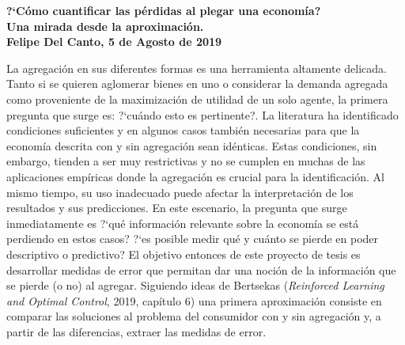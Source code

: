 \documentclass[english, a4paper,12pt]{article}
\begin{document}
\thispagestyle{empty}
%
%
%
\begin{center} \bf
	?`Cómo cuantificar las pérdidas al plegar una economía? \\ Una mirada desde la aproximación. \\ Felipe Del Canto, 5 de Agosto de 2019
\end{center}

La agregación en sus diferentes formas es una herramienta altamente delicada. Tanto si se quieren aglomerar bienes en uno o considerar la demanda agregada como proveniente de la maximización de utilidad de un solo agente, la primera pregunta que surge es: ?`cuándo esto es pertinente?. La literatura ha identificado condiciones suficientes y en algunos casos también necesarias para que la economía descrita con y sin agregación sean idénticas. Estas condiciones, sin embargo, tienden a ser muy restrictivas y no se cumplen en muchas de las aplicaciones empíricas donde la agregación es crucial para la identificación. Al mismo tiempo, su uso inadecuado puede afectar la interpretación de los resultados y sus predicciones. En este escenario, la pregunta que surge inmediatamente es ?`qué información relevante sobre la economía se está perdiendo en estos casos? ?`es posible medir qué y cuánto se pierde en poder descriptivo o predictivo? El objetivo entonces de este proyecto de tesis es desarrollar medidas de error que permitan dar una noción de la información que se pierde (o no) al agregar. Siguiendo ideas de Bertsekas (\textit{Reinforced Learning and Optimal Control}, 2019, capítulo 6) una primera aproximación consiste en comparar las soluciones al problema del consumidor con y sin agregación y, a partir de las diferencias, extraer las medidas de error. 
	


\end{document}
